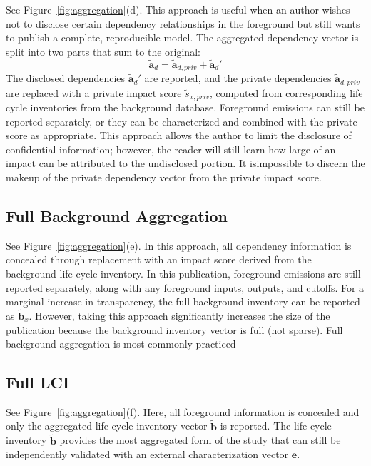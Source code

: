 See Figure~\ref{fig:aggregation}(d). This approach is useful when an author wishes not to disclose certain dependency relationships in the foreground but still wants to publish a complete, reproducible model.  The aggregated dependency vector is split into two parts that sum to the original:
\begin{equation}
 \tilde{\mathbf{a}}_d = \tilde{\mathbf{a}}_{d,priv} + \tilde{\mathbf{a}}_d'
\end{equation}
The disclosed dependencies $\tilde{\mathbf{a}}_d'$ are reported, and the private dependencies $\tilde{\mathbf{a}}_{d,priv}$ are replaced with a private impact score $\tilde{s}_{x,priv}$, computed from corresponding life cycle inventories from the background database.  Foreground emissions can still be reported separately, or they can be characterized and combined with the private score as appropriate.  This approach allows the author to limit the disclosure of confidential information; however, the reader will still learn how large of an impact can be attributed to the undisclosed portion.  It isimpossible to discern the makeup of the private dependency vector from the private impact score.

\subsection{Full Background Aggregation}

See Figure~\ref{fig:aggregation}(e). In this approach, all dependency information is concealed through replacement with an impact score derived from the background life cycle inventory.  In this publication, foreground emissions are still reported separately, along with any foreground inputs, outputs, and cutoffs.  For a marginal increase in transparency, the full background inventory can be reported as $\tilde{\mathbf{b}}_x$.  However, taking this approach significantly increases the size of the publication because the background inventory vector is full (not sparse).  Full background aggregation is most commonly practiced

\subsection{Full LCI}

See Figure~\ref{fig:aggregation}(f). Here, all foreground information is concealed and only the aggregated life cycle inventory vector $\tilde{\mathbf{b}}$ is reported.  The life cycle inventory $\tilde{\mathbf{b}}$ provides the most aggregated form of the study that can still be independently validated with an external characterization vector $\mathbf{e}$.  

